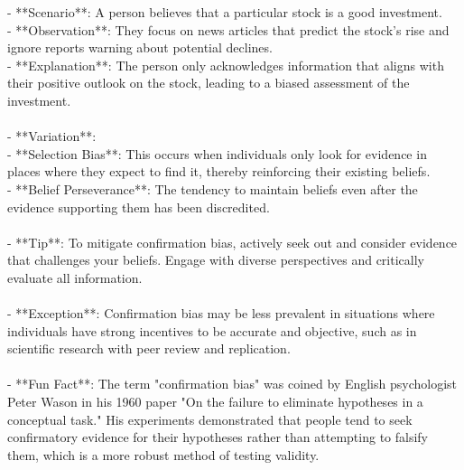 \documentclass[a4paper,12pt,single,pdftex]{scrbook}
\begin{document}
{    
        - **Scenario**: A person believes that a particular stock is a good investment.
    \\

    
        - **Observation**: They focus on news articles that predict the stock's rise and ignore reports warning about potential declines.
    \\

    
        - **Explanation**: The person only acknowledges information that aligns with their positive outlook on the stock, leading to a biased assessment of the investment.
    \\

    
      
    \\

    
      - **Variation**:
    \\

    
        - **Selection Bias**: This occurs when individuals only look for evidence in places where they expect to find it, thereby reinforcing their existing beliefs.
    \\

    
        - **Belief Perseverance**: The tendency to maintain beliefs even after the evidence supporting them has been discredited.
    \\

    
      
    \\

    
      - **Tip**: To mitigate confirmation bias, actively seek out and consider evidence that challenges your beliefs. Engage with diverse perspectives and critically evaluate all information.
    \\

    
      
    \\

    
      - **Exception**: Confirmation bias may be less prevalent in situations where individuals have strong incentives to be accurate and objective, such as in scientific research with peer review and replication.
    \\

    
      
    \\

    
      - **Fun Fact**: The term "confirmation bias" was coined by English psychologist Peter Wason in his 1960 paper "On the failure to eliminate hypotheses in a conceptual task." His experiments demonstrated that people tend to seek confirmatory evidence for their hypotheses rather than attempting to falsify them, which is a more robust method of testing validity.
    \\

  }
\end{document}
